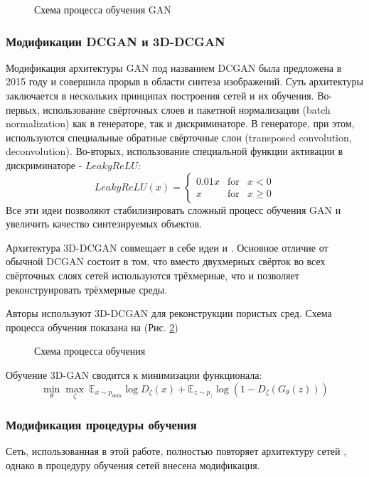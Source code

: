 			\begin{figure}[h!]
				\caption{Схема процесса обучения GAN}
				\label{2-gan-training}
			\end{figure}
	
		\subsubsection{Модификации DCGAN и 3D-DCGAN}
			Модификация архитектуры GAN под названием DCGAN \cite{Radford} была предложена в 2015 году и совершила прорыв в области синтеза изображений. Суть архитектуры заключается в нескольких принципах построения сетей и их обучения. Во-первых, использование свёрточных слоев и пакетной нормализации (batch normalization)  как в генераторе, так и дискриминаторе. В генераторе, при этом, используются специальные обратные свёрточные слои (transposed convolution, deconvolution). Во-вторых, использование специальной функции активации в дискриминаторе - $LeakyReLU$:
			\[ LeakyReLU(x) = \left \{ \begin{array}{rcl} 0.01 x & \mbox{for} & x < 0\\ x & \mbox{for} & x \ge 0\end{array} \right .\]  
			Все эти идеи позволяют стабилизировать сложный процесс обучения GAN и увеличить качество синтезируемых объектов.
			
			Архитектура 3D-DCGAN совмещает в себе идеи \cite{Radford} и \cite{Wu}. Основное отличие от обычной DCGAN состоит в том, что вместо двухмерных свёрток во всех свёрточных слоях сетей используются трёхмерные, что и позволяет реконструировать трёхмерные среды.
			
			Авторы \cite{Mosser} используют 3D-DCGAN для реконструкции пористых сред. Схема процесса обучения показана на (Рис. \ref{2-gan-scheme})
			
			\begin{figure}[h!]
				\caption{Схема процесса обучения}
				\label{2-gan-scheme}
			\end{figure}
		
			Обучение 3D-GAN сводится к минимизации функционала:
			\[ \underset{\theta}{\min} \underset{\zeta}{\max} \ \mathbb{E}_{x \sim p_{data}}\log D_\zeta(x) + \mathbb{E}_{z \sim p_{z}} \log (1 - D_\zeta(G_\theta(z))) \]
		
		\subsubsection{Модификация процедуры обучения}
			Сеть, использованная в этой работе, полностью повторяет архитектуру сетей \cite{Mosser}, однако в процедуру обучения сетей внесена модификация.
			
